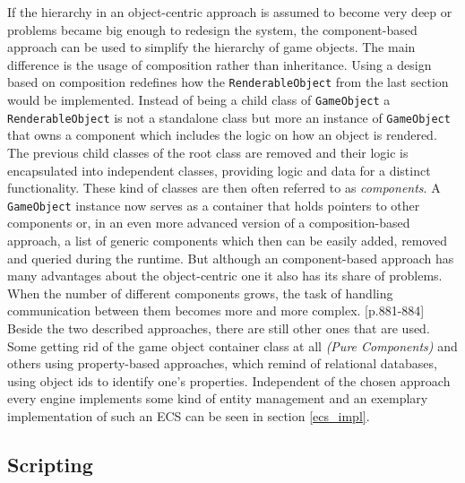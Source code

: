 If the hierarchy in an object-centric approach is assumed to become very deep or problems became big enough to redesign the system, the component-based approach can be used to simplify the hierarchy of game objects. The main difference is the usage of composition rather than inheritance. Using a design based on composition redefines how the \texttt{RenderableObject} from the last section would be implemented. Instead of being a child class of \texttt{GameObject} a \texttt{RenderableObject} is not a standalone class but more an instance of \texttt{GameObject} that owns a component which includes the logic on how an object is rendered. The previous child classes of the root class are removed and their logic is encapsulated into independent classes, providing logic and data for a distinct functionality. These kind of classes are then often referred to as \textit{components}. A \texttt{GameObject} instance now serves as a container that holds pointers to other components or, in an even more advanced version of a composition-based approach, a list of generic components which then can be easily added, removed and queried during the runtime. But although an component-based approach has many advantages about the object-centric one it also has its share of problems. When the number of different components grows, the task of handling communication between them becomes more and more complex. \cite{GEA_2}[p.881-884] \\

\noindent
Beside the two described approaches, there are still other ones that are used. Some getting rid of the game object container class at all \textit{(Pure Components)} and others using property-based approaches, which remind of relational databases, using object ids to identify one's properties. Independent of the chosen approach every engine implements some kind of entity management and an exemplary implementation of such an \acl{ECS} can be seen in section \ref{ecs_impl}.

\subsection{Scripting}

